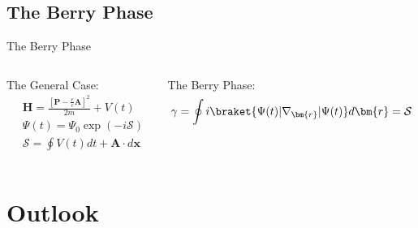 \documentclass[9pt]{beamer}
\begin{document}
\subsection{The Berry Phase}
\begin{frame}{The Berry Phase}
 
  \begin{columns}[t]
    \begin{column}{0.6\textwidth}

      The General Case:
      \begin{align*}
          &\bm{H} = \frac{\left[ \bm{P} - \frac{e}{c}\bm{A} \right]^{2}}{2m} + V(t) \\
          &\Psi(t) = \Psi_{0} \exp(-i \mathcal{S}) \\
          &\mathcal{S} = \oint V(t) dt + \bm{A} \cdot d\bm{x} 
      \end{align*}


    \end{column}

    \begin{column}{0.4\textwidth}

      The Berry Phase:
      \begin{equation*}
        \gamma = \oint i\braket{\Psi(t)|\nabla_{\bm{r}}|\Psi(t)} d\bm{r} = \mathcal{S}
      \end{equation*}

    \end{column}

  \end{columns}
\end{frame}

\section{Outlook}

      
\end{document}
